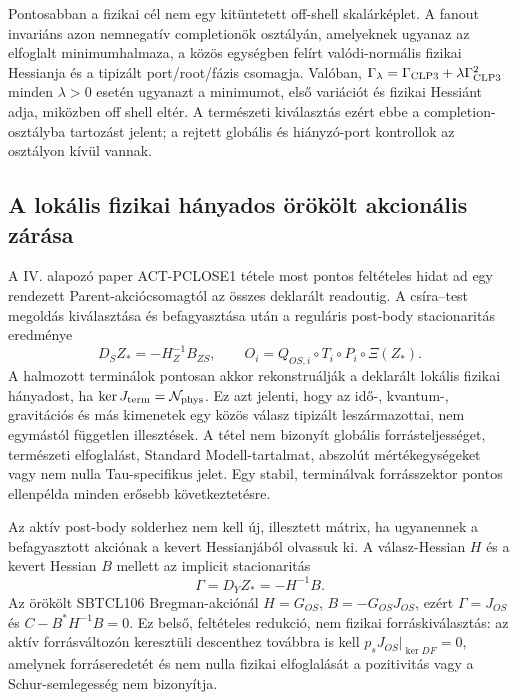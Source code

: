 \documentclass[12pt]{article}
\begin{document}
Pontosabban a fizikai cél nem egy kitüntetett off-shell skalárképlet. A fanout
invariáns azon nemnegatív completionök osztályán, amelyeknek ugyanaz az
elfoglalt minimumhalmaza, a közös egységben felírt valódi-normális fizikai
Hessianja és a tipizált port/root/fázis csomagja. Valóban,
$\Gamma_\lambda=\Gamma_{\rm CLP3}+\lambda\Gamma_{\rm CLP3}^2$ minden
$\lambda>0$ esetén ugyanazt a minimumot, első variációt és fizikai Hessiánt
adja, miközben off shell eltér. A természeti kiválasztás ezért ebbe a
completion-osztályba tartozást jelent; a rejtett globális és hiányzó-port
kontrollok az osztályon kívül vannak.

\subsection*{A lokális fizikai hányados örökölt akcionális zárása}

A IV. alapozó paper ACT-PCLOSE1 tétele most pontos feltételes hidat ad egy
rendezett Parent-akciócsomagtól az összes deklarált readoutig. A csíra--test
megoldás kiválasztása és befagyasztása után a reguláris post-body stacionaritás
eredménye
\[
 D_SZ_*=-H_Z^{-1}B_{ZS},
 \qquad O_i=Q_{OS,i}\circ T_i\circ P_i\circ\Xi(Z_*).
\]
A halmozott terminálok pontosan akkor rekonstruálják a deklarált lokális
fizikai hányadost, ha
$\ker J_{\rm term}=\mathcal N_{\rm phys}$. Ez azt jelenti, hogy az idő-,
kvantum-, gravitációs és más kimenetek egy közös válasz tipizált leszármazottai,
nem egymástól független illesztések. A tétel nem bizonyít globális
forrásteljességet, természeti elfoglalást, Standard Modell-tartalmat, abszolút
mértékegységeket vagy nem nulla Tau-specifikus jelet. Egy stabil,
terminálvak forrásszektor pontos ellenpélda minden erősebb következtetésre.

Az aktív post-body solderhez nem kell új, illesztett mátrix, ha ugyanennek a
befagyasztott akciónak a kevert Hessianjából olvassuk ki. A válasz-Hessian
\(H\) és a kevert Hessian \(B\) mellett az implicit stacionaritás
\begin{equation}
 \Gamma=D_YZ_*=-H^{-1}B.
 \label{eq:active-solder-mixed-hessian-hu}
\end{equation}
Az örökölt SBTCL106 Bregman-akciónál
\(H=G_{OS}\), \(B=-G_{OS}J_{OS}\), ezért
\(\Gamma=J_{OS}\) és \(C-B^*H^{-1}B=0\). Ez belső, feltételes redukció,
nem fizikai forráskiválasztás: az aktív forrásváltozón keresztüli descenthez
továbbra is kell
\(p_sJ_{OS}|_{\ker DF}=0\), amelynek forráseredetét és nem nulla fizikai
elfoglalását a pozitivitás vagy a Schur-semlegesség nem bizonyítja.
\end{document}
